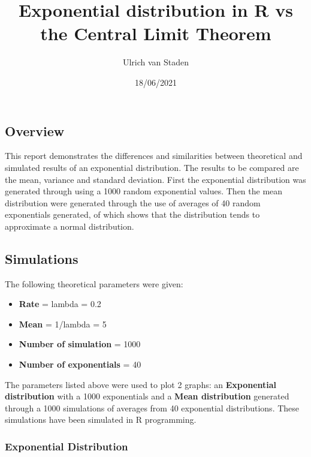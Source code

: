 \documentclass[
]{article}
\title{Exponential distribution in R vs the Central Limit Theorem}
\author{Ulrich van Staden}
\date{18/06/2021}
\providecommand{\tightlist}{%
  \setlength{\itemsep}{0pt}\setlength{\parskip}{0pt}}
\begin{document}
\maketitle

\hypertarget{overview}{%
\subsection{Overview}\label{overview}}

This report demonstrates the differences and similarities between
theoretical and simulated results of an exponential distribution. The
results to be compared are the mean, variance and standard deviation.
First the exponential distribution was generated through using a 1000
random exponential values. Then the mean distribution were generated
through the use of averages of 40 random exponentials generated, of
which shows that the distribution tends to approximate a normal
distribution.

\hypertarget{simulations}{%
\subsection{Simulations}\label{simulations}}

The following theoretical parameters were given:

\begin{itemize}
\tightlist
\item
  \textbf{Rate} = lambda = 0.2
\item
  \textbf{Mean} = 1/lambda = 5
\item
  \textbf{Number of simulation} = 1000
\item
  \textbf{Number of exponentials} = 40
\end{itemize}

The parameters listed above were used to plot 2 graphs: an
\textbf{Exponential distribution} with a 1000 exponentials and a
\textbf{Mean distribution} generated through a 1000 simulations of
averages from 40 exponential distributions. These simulations have been
simulated in R programming.

\hypertarget{exponential-distribution}{%
\subsubsection{Exponential
Distribution}\label{exponential-distribution}}
\end{document}
